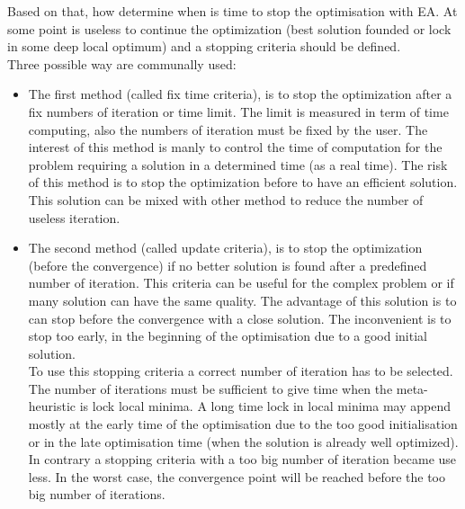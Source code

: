
Based on that, how  determine when is time to stop the optimisation with EA. At some point is useless to continue the optimization (best solution founded or lock in some deep local optimum) and a stopping criteria should be defined.\\ 
Three possible way are communally used:\\
\begin{itemize}
\item The first method (called fix time criteria), is to stop the optimization after a fix numbers of iteration or time limit. The limit is measured in term of time computing, also the numbers of iteration must be fixed by the user. The interest of this method is manly to control the time of computation for the problem requiring a solution in a determined time (as a real time). The risk of this method is to stop the optimization before to have an efficient solution. \\
This solution can be mixed with other method to reduce the number of useless iteration.%

\item The second method (called update criteria), is to stop the optimization (before the convergence) if no better solution is found after a predefined number of iteration. This criteria can be useful for the complex problem or if many solution can have the same quality. 
The advantage of this solution is to can stop before the convergence with a close solution. The inconvenient is to stop too early, in the beginning of the optimisation due to a good initial solution.   \\
To use this stopping criteria a correct number of iteration has to  be selected. 
The number of iterations  must be sufficient to give time when the meta-heuristic is lock local minima. 
A long time lock in local minima may append mostly at the early time of the optimisation due to the too good initialisation or in the late optimisation time (when the solution is already well optimized).\\
 In contrary a stopping criteria with a too big number of iteration became use less. In the worst case, the convergence point will be reached  before the too big number of iterations.


\end{itemize}
